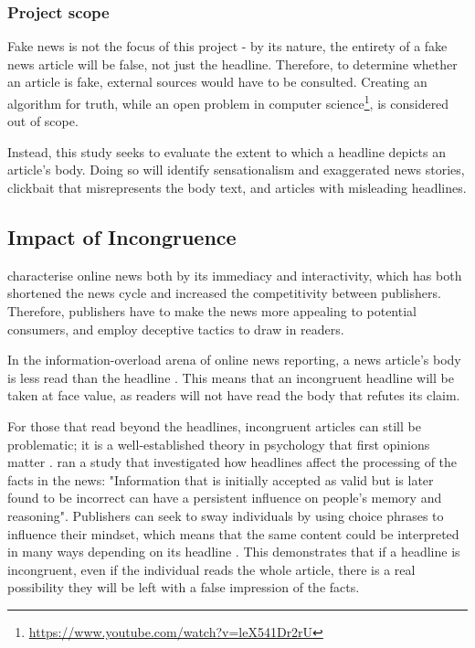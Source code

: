 \subsubsection{Project scope}
Fake news is not the focus of this project - by its nature, the entirety of a fake news article will be false, not just the headline. Therefore, to determine whether an article is fake, external sources would have to be consulted. Creating an algorithm for truth, while an open problem in computer science\footnote{\url{https://www.youtube.com/watch?v=leX541Dr2rU}}, is considered out of scope.

Instead, this study seeks to evaluate the extent to which a headline depicts an article's body. Doing so will identify sensationalism and exaggerated news stories, clickbait that misrepresents the body text, and articles with misleading headlines. 

\subsection{Impact of Incongruence}
 characterise online news both by its immediacy and interactivity, which has both shortened the news cycle and increased the competitivity between publishers. Therefore, publishers have to make the news more appealing to potential consumers, and employ deceptive tactics to draw in readers.

In the information-overload arena of online news reporting, a news article's body is less read than the headline \cite{gabielkov2016}. This means that an incongruent headline will be taken at face value, as readers will not have read the body that refutes its claim.

For those that read beyond the headlines, incongruent articles can still be problematic; it is a well-established theory in psychology that first opinions matter \cite{digirolamo1997}.  ran a study that investigated how headlines affect the processing of the facts in the news:  "Information that is initially accepted as valid but is later found to be incorrect can have a persistent influence on people's memory and reasoning". Publishers can seek to sway individuals by using choice phrases to influence their mindset, which means that the same content could be interpreted in many ways depending on its headline \cite{reis2015}. This demonstrates that if a headline is incongruent, even if the individual reads the whole article, there is a real possibility they will be left with a false impression of the facts.



